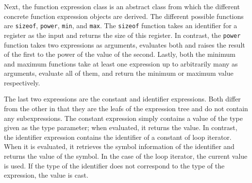 Next, the function expression class is an abstract class from which the different concrete function expression objects are derived. The different possible functions are \texttt{sizeof}, \texttt{power}, \texttt{min}, and \texttt{max}. The \texttt{sizeof} function takes an identifier for a register as the input and returns the size of this register. In contrast, the \texttt{power} function takes two expressions as arguments, evaluates both and raises the result of the first to the power of the value of the second. Lastly, both the minimum and maximum functions take at least one expression up to arbitrarily many as arguments, evaluate all of them, and return the minimum or maximum value respectively.

The last two expressions are the constant and identifier expressions. Both differ from the other in that they are the leafs of the expression tree and do not contain any subexpressions. The constant expression simply contains a value of the type given as the type parameter; when evaluated, it returns the value. In contrast, the identifier expression contains the identifier of a constant of loop iterator. When it is evaluated, it retrieves the symbol information of the identifier and returns the value of the symbol. In the case of the loop iterator, the current value is used. If the type of the identifier does not correspond to the type of the expression, the value is cast.